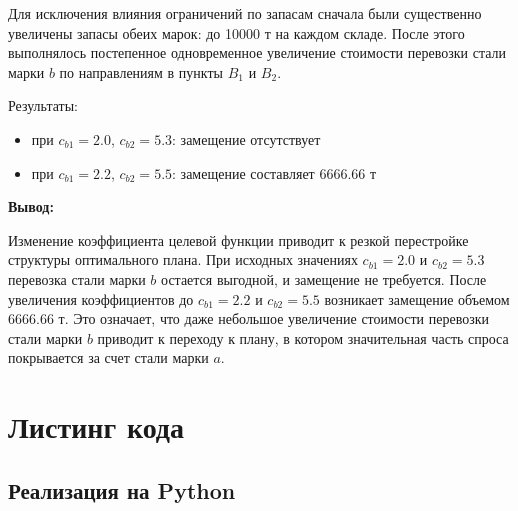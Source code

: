 \documentclass[a4paper,12pt]{article}
\begin{document}
Для исключения влияния ограничений по запасам сначала были существенно
увеличены запасы обеих марок: до 10000 т на каждом складе. После этого
выполнялось постепенное одновременное увеличение стоимости перевозки стали
марки $b$ по направлениям в пункты $B_1$ и $B_2$.

Результаты:

\begin{itemize}
    \item при $c_{b1} = 2.0$, $c_{b2} = 5.3$: замещение отсутствует
    \item при $c_{b1} = 2.2$, $c_{b2} = 5.5$: замещение составляет $6666.66$ т
\end{itemize}

\textbf{Вывод:}

Изменение коэффициента целевой функции приводит к резкой перестройке структуры
оптимального плана. При исходных значениях $c_{b1} = 2.0$ и $c_{b2} = 5.3$
перевозка стали марки $b$ остается выгодной, и замещение не требуется.
После увеличения коэффициентов до $c_{b1} = 2.2$ и $c_{b2} = 5.5$ возникает
замещение объемом $6666.66$ т. Это означает, что даже небольшое увеличение
стоимости перевозки стали марки $b$ приводит к переходу к плану, в котором
значительная часть спроса покрывается за счет стали марки $a$.

\section{Листинг кода}

\subsection{Реализация на Python}


\end{document}
